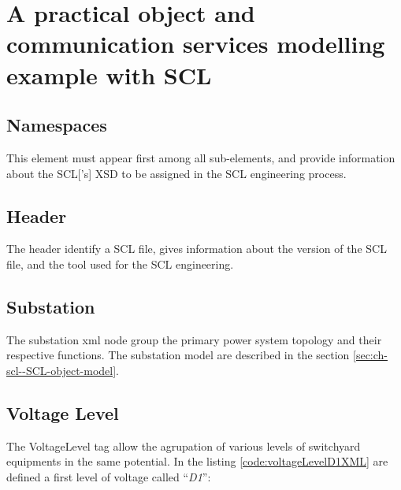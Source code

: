 \section{A practical object and 
communication services modelling example with SCL}


\subsection{Namespaces}
	This element must appear first among all sub-elements, 
	and provide information about the \gls{SCL}['s] \gls{XSD}  
	to be assigned in the SCL engineering process.  
	
	





\subsection{Header}
	The header identify a SCL file, gives information about 
	the version of the SCL file, and the tool used for the 
	SCL engineering.
	




\subsection{Substation}
	The substation xml node group the primary power system topology
	and their respective functions.
	The substation model are described in the section
	\ref{sec:ch-scl--SCL-object-model}.
	
	




\subsection{Voltage Level}
	The VoltageLevel tag allow the agrupation 
	of various levels of switchyard equipments in the same 
	potential. %
	In the listing \ref{code:voltageLevelD1XML} 
	are defined a first level of voltage called ``\emph{D1}'':
	
	
	
